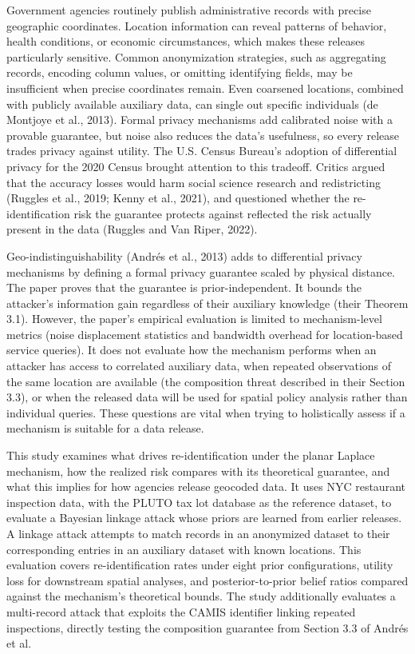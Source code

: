 \documentclass[11pt]{article}
\begin{document}
Government agencies routinely publish administrative records with precise geographic coordinates. Location information can reveal patterns of behavior, health conditions, or economic circumstances, which makes these releases particularly sensitive. Common anonymization strategies, such as aggregating records, encoding column values, or omitting identifying fields, may be insufficient when precise coordinates remain. Even coarsened locations, combined with publicly available auxiliary data, can single out specific individuals (de Montjoye et al., 2013). Formal privacy mechanisms add calibrated noise with a provable guarantee, but noise also reduces the data’s usefulness, so every release trades privacy against utility. The U.S. Census Bureau’s adoption of differential privacy for the 2020 Census brought attention to this tradeoff. Critics argued that the accuracy losses would harm social science research and redistricting (Ruggles et al., 2019; Kenny et al., 2021), and questioned whether the re-identification risk the guarantee protects against reflected the risk actually present in the data (Ruggles and Van Riper, 2022).

Geo-indistinguishability (Andr\'es et al., 2013) adds to differential privacy mechanisms by defining a formal privacy guarantee scaled by physical distance. The paper proves that the guarantee is prior-independent. It bounds the attacker's information gain regardless of their auxiliary knowledge (their Theorem 3.1). However, the paper's empirical evaluation is limited to mechanism-level metrics (noise displacement statistics and bandwidth overhead for location-based service queries). It does not evaluate how the mechanism performs when an attacker has access to correlated auxiliary data, when repeated observations of the same location are available (the composition threat described in their Section 3.3), or when the released data will be used for spatial policy analysis rather than individual queries. These questions are vital when trying to holistically assess if a mechanism is suitable for a data release.

This study examines what drives re-identification under the planar Laplace mechanism, how the realized risk compares with its theoretical guarantee, and what this implies for how agencies release geocoded data. It uses NYC restaurant inspection data, with the PLUTO tax lot database as the reference dataset, to evaluate a Bayesian linkage attack whose priors are learned from earlier releases. A linkage attack attempts to match records in an anonymized dataset to their corresponding entries in an auxiliary dataset with known locations. This evaluation covers re-identification rates under eight prior configurations, utility loss for downstream spatial analyses, and posterior-to-prior belief ratios compared against the mechanism's theoretical bounds. The study additionally evaluates a multi-record attack that exploits the CAMIS identifier linking repeated inspections, directly testing the composition guarantee from Section 3.3 of Andr\'es et al.
\end{document}
